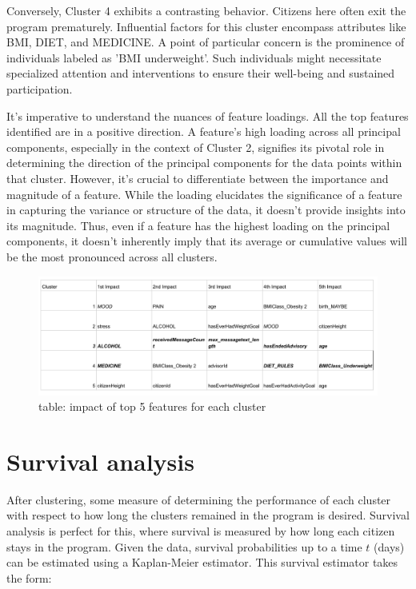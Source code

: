 \documentclass[12pt]{article}
\begin{document}
Conversely, Cluster 4 exhibits a contrasting behavior. Citizens here often exit the program prematurely. Influential factors for this cluster encompass attributes like BMI, DIET, and MEDICINE. A point of particular concern is the prominence of individuals labeled as 'BMI underweight'. Such individuals might necessitate specialized attention and interventions to ensure their well-being and sustained participation.

It's imperative to understand the nuances of feature loadings. All the top features identified are in a positive direction. A feature's high loading across all principal components, especially in the context of Cluster 2, signifies its pivotal role in determining the direction of the principal components for the data points within that cluster. However, it's crucial to differentiate between the importance and magnitude of a feature. While the loading elucidates the significance of a feature in capturing the variance or structure of the data, it doesn't provide insights into its magnitude. Thus, even if a feature has the highest loading on the principal components, it doesn't inherently imply that its average or cumulative values will be the most pronounced across all clusters.

\begin{figure}[h]
  \centering
  \includegraphics[width=0.7\linewidth]{images/table.png}
  \caption{table: impact of top 5 features for each cluster}
  \label{fig:table}
  \end{figure}



\section{Survival analysis}
		
		After clustering, some measure of determining the performance of each cluster with respect to how long the clusters remained in the program is desired. Survival analysis is perfect for this, where survival is measured by how long each citizen stays in the program. Given the data, survival probabilities up to a time $t$ (days) can be estimated using a Kaplan-Meier estimator. This survival estimator takes the form:
		
\end{document}
